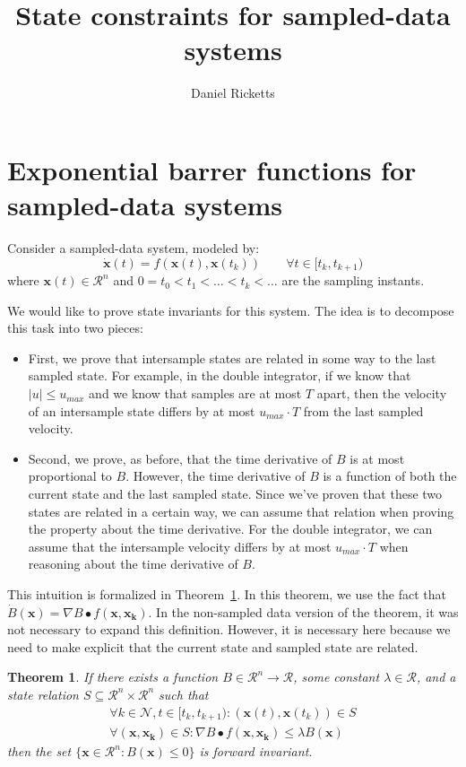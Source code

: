 \documentclass[12pt]{article}
\title{State constraints for sampled-data systems}
\author{Daniel Ricketts}
\newtheorem{theorem}{Theorem}
\newcommand{\vecbold}[1]{\boldsymbol{#1}}
\newcommand{\state}{\mathcal{R}^n}
\begin{document}
\maketitle

\section{Exponential barrer functions for sampled-data systems}
Consider a sampled-data system, modeled by:
\[\dot{\vecbold{x}}(t) = f(\vecbold{x}(t),\vecbold{x}(t_k))\qquad\forall t \in [t_k, t_{k+1})\]
where $\vecbold{x}(t) \in \state$ and $0 = t_0 < t_1 < \ldots < t_k < \ldots$ are the sampling instants.

We would like to prove state invariants for this system. The idea is to
decompose this task into two pieces:
\begin{itemize}
\item First, we prove that intersample states are related in some way to
  the last sampled state. For example, in the double integrator, if we know
  that $|u| \leq u_{max}$ and we know that samples are at most $T$ apart,
  then the velocity of an intersample state differs by at most $u_{max}\cdot T$
  from the last sampled velocity.
\item Second, we prove, as before, that the time derivative of $B$ is at
  most proportional to $B$. However, the time derivative of $B$ is a
  function of both the current state and the last sampled state. Since
  we've proven that these two states are related in a certain way, we can
  assume that relation when proving the property about the time
  derivative. For the double integrator, we can assume that the intersample
  velocity differs by at most $u_{max}\cdot T$ when reasoning about the
  time derivative of $B$.
\end{itemize}

This intuition is formalized in Theorem~\ref{thm:exp-barrier-sampled}. In
this theorem, we use the fact that $\dot{B}(\vecbold{x}) = \nabla B \bullet
f(\vecbold{x},\vecbold{x_k})$. In the non-sampled data version of the
theorem, it was not necessary to expand this definition. However, it is
necessary here because we need to make explicit that the current state and
sampled state are related.

\begin{theorem}
If there exists a function $B \in \state \rightarrow \mathcal{R}$, some constant $\lambda \in \mathcal{R}$, and a state relation $S \subseteq \state \times \state$ such that
\begin{align}
\label{thm:exp-barrier-sampled:rel}
\forall k \in \mathcal{N}, t \in [t_k, t_{k+1}) : (\vecbold{x}(t),\vecbold{x}(t_k)) \in S \\
\label{thm:exp-barrier-sampled:dt}
\forall (\vecbold{x}, \vecbold{x_k}) \in S : \nabla B \bullet f(\vecbold{x},\vecbold{x_k}) \leq \lambda B(\vecbold{x})
\end{align}
then the set $\{\vecbold{x} \in \mathcal{R}^n : B(\vecbold{x}) \leq 0\}$ is forward invariant.
\label{thm:exp-barrier-sampled}
\end{theorem}
\end{document}
